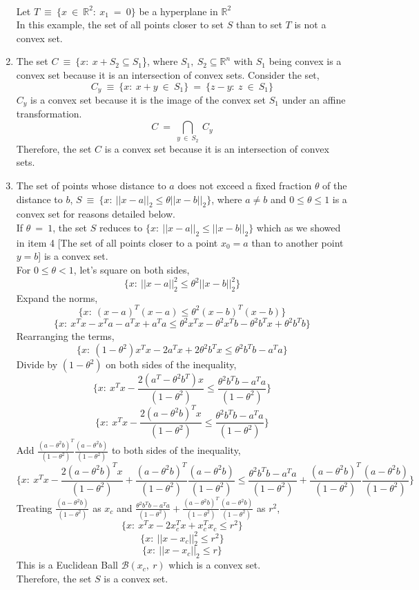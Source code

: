 \documentclass[12pt, draftcls, onecolumn]{IEEEtran}
\begin{document}
\begin{enumerate}
    \\Let $T\ \equiv\ \{x\ \in\ \mathbb{R}^2:\ x_1\ =\ 0\}$ be a hyperplane in $\mathbb{R}^2$
    \\In this example, the set of all points closer to set $S$ than to set $T$ is not a convex set.
    \item The set $C\ \equiv\ \{x:\ x+S_2 \subseteq S_1$\}, where $S_1,\ S_2 \subseteq \mathbb{R}^n$ with $S_1$ being convex is a convex set because it is an intersection of convex sets.
    Consider the set,
    \[C_y\ \equiv\ \{x:\ x+y\ \in\ S_1\}\ =\ \{z-y:\ z\ \in\ S_1\}\]
    $C_y$ is a convex set because it is the image of the convex set $S_1$ under an affine transformation.
    \[C\ =\ \bigcap_{y\ \in\ S_2}\ C_y\]
    Therefore, the set $C$ is a convex set because it is an intersection of convex sets.
    \item The set of points whose distance to $a$ does not exceed a fixed fraction $\theta$ of the distance to $b$, $S\ \equiv\ \{x:\ ||x-a||_2 \leq \theta ||x-b||_2\}$, where $a \neq b$ and $0 \leq \theta \leq 1$ is a convex set for reasons detailed below.
    \\If $\theta\ =\ 1$, the set $S$ reduces to $\{x:\ ||x-a||_2 \leq ||x-b||_2\}$ which as we showed in item 4 [The set of all points closer to a point $x_0=a$ than to another point $y=b$] is a convex set.
    \\For $0 \leq \theta < 1$, let's square on both sides,
    \[\{x:\ ||x-a||_2^2 \leq \theta^2 ||x-b||_2^2\}\]
    Expand the norms,
    \[\{x:\ (x-a)^T(x-a) \leq \theta^2 (x-b)^T(x-b)\}\]
    \[\{x:\ x^Tx-x^Ta-a^Tx+a^Ta \leq \theta^2x^Tx-\theta^2x^Tb-\theta^2b^Tx+\theta^2b^Tb\}\]
    Rearranging the terms,
    \[\{x:\ (1-\theta^2)x^Tx-2a^Tx+2\theta^2b^Tx \leq \theta^2b^Tb-a^Ta\}\]
    Divide by $(1-\theta^2)$ on both sides of the inequality,
    \[\{x:\ x^Tx-\frac{2(a^T-\theta^2b^T)x}{(1-\theta^2)} \leq \frac{\theta^2b^Tb-a^Ta}{(1-\theta^2)}\}\]
    \[\{x:\ x^Tx-\frac{2(a-\theta^2b)^Tx}{(1-\theta^2)} \leq \frac{\theta^2b^Tb-a^Ta}{(1-\theta^2)}\}\]
    Add $\frac{(a-\theta^2b)^T}{(1-\theta^2)}\frac{(a-\theta^2b)}{(1-\theta^2)}$ to both sides of the inequality,
    \[\{x:\ x^Tx-\frac{2(a-\theta^2b)^Tx}{(1-\theta^2)}+\frac{(a-\theta^2b)^T}{(1-\theta^2)}\frac{(a-\theta^2b)}{(1-\theta^2)} \leq \frac{\theta^2b^Tb-a^Ta}{(1-\theta^2)}+\frac{(a-\theta^2b)^T}{(1-\theta^2)}\frac{(a-\theta^2b)}{(1-\theta^2)}\}\]
    Treating $\frac{(a-\theta^2b)}{(1-\theta^2)}$ as $x_c$ and $\frac{\theta^2b^Tb-a^Ta}{(1-\theta^2)}+\frac{(a-\theta^2b)^T}{(1-\theta^2)}\frac{(a-\theta^2b)}{(1-\theta^2)}$ as $r^2$,
    \[\{x:\ x^Tx-2x_c^Tx+x_c^Tx_c \leq r^2\}\]
    \[\{x:\ ||x-x_c||_2^2 \leq r^2\}\]
    \[\{x:\ ||x-x_c||_2 \leq r\}\]
    This is a Euclidean Ball $\mathcal{B}(x_c,\ r)$ which is a convex set.
    \\Therefore, the set $S$ is a convex set.
\end{enumerate}
\end{document}
